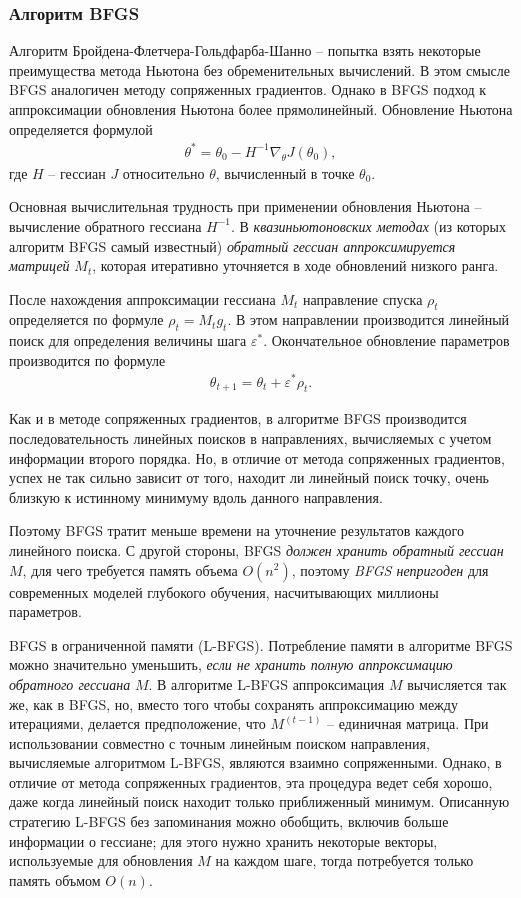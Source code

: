 \documentclass[%
	11pt,
	a4paper,
	utf8,
]{article}
\begin{document}
\subsubsection{Алгоритм BFGS}

Алгоритм Бройдена-Флетчера-Гольдфарба-Шанно -- попытка взять некоторые преимущества метода Ньютона без обременительных вычислений. В этом смысле BFGS аналогичен методу сопряженных градиентов. Однако в BFGS подход к аппроксимации обновления Ньютона более прямолинейный. Обновление Ньютона определяется формулой
\begin{align*}
	\theta^* = \theta_0 - H^{-1} \nabla_\theta J(\theta_0),
\end{align*}
где $ H $ -- гессиан $ J $ относительно $ \theta $, вычисленный в точке $ \theta_0 $. 

{\color{red}Основная вычислительная трудность при применении обновления Ньютона -- вычисление обратного гессиана $ H^{-1} $}. В \emph{квазиньютоновских методах} (из которых алгоритм BFGS самый известный) \emph{обратный гессиан аппроксимируется матрицей} $ M_t $, которая итеративно уточняется в ходе обновлений низкого ранга.

После нахождения аппроксимации гессиана $ M_t $ направление спуска $ \rho_t $ определяется по формуле $ \rho_t = M_t g_t $. В этом направлении производится линейный поиск для определения величины шага $ \varepsilon^* $. Окончательное обновление параметров производится по формуле
\begin{align*}
	\theta_{t+1} = \theta_t + \varepsilon^* \rho_t.
\end{align*}

Как и в методе сопряженных градиентов, в алгоритме BFGS производится последовательность линейных поисков в направлениях, вычисляемых с учетом информации второго порядка. Но, в отличие от метода сопряженных градиентов, успех не так сильно зависит от того, находит ли линейный поиск точку, очень близкую к истинному минимуму вдоль данного направления.

Поэтому BFGS тратит меньше времени на уточнение результатов каждого линейного поиска. С другой стороны, {\color{red}BFGS \emph{должен хранить обратный гессиан} $ M $, для чего требуется память объема $ O(n^2) $, поэтому \emph{BFGS непригоден} для современных моделей глубокого обучения, насчитывающих миллионы параметров.}

BFGS в ограниченной памяти (L-BFGS). Потребление памяти в алгоритме BFGS можно значительно уменьшить, \emph{если не хранить полную аппроксимацию обратного гессиана} $ M $. В алгоритме L-BFGS аппроксимация $ M $ вычисляется так же, как в BFGS, но, вместо того чтобы сохранять аппроксимацию между итерациями, делается предположение, что $ M^{(t-1)} $ -- единичная матрица. При использовании совместно с точным линейным поиском направления, вычисляемые алгоритмом L-BFGS, являются взаимно сопряженными. Однако, в отличие от метода сопряженных градиентов, эта процедура ведет себя хорошо, даже когда линейный поиск находит только приближенный минимум. Описанную стратегию L-BFGS без запоминания можно обобщить, включив больше информации о гессиане; для этого нужно хранить некоторые векторы, используемые для обновления $ M $ на каждом шаге, тогда потребуется только память объмом $ O(n) $.
\end{document}
